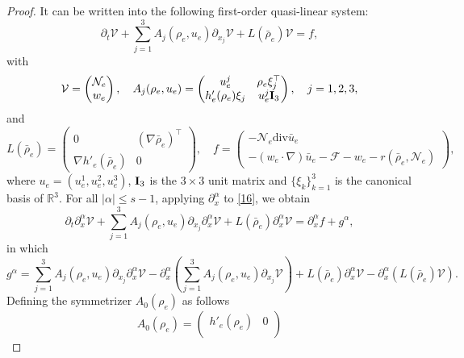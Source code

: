 \documentclass[reqno,twoside,12pt,a4paper]{amsart}
\newcommand{\R}{\mathbb{R}}
\newcommand{\al}{\alpha}
\newcommand{\dive}{\mathrm{div}}
\newcommand{\pt}{\partial_t}
\newcommand{\pa}{\partial}
\numberwithin{equation}{section}
\begin{document}
\begin{proof}
It can be written into the following first-order quasi-linear system:
\begin{equation}\label{16}
    \pt \mathcal{V}+\sum_{j=1}^3 A_j(\rho_e,u_e) \partial_{x_j} \mathcal{V}+ L(\bar{\rho}_e)\mathcal{V}=f,
\end{equation}
with 
\begin{equation*}
    \mathcal{V}=\begin{pmatrix}
    \mathcal{N}_e \\
    w_e
    \end{pmatrix}, \ \ \
    A_j(\rho_e,u_e)=\begin{pmatrix}
    u_{e}^j & \rho_e \xi_j^\top\\
    h'_e(\rho_e)\xi_j& u_{e}^j {\bf{I}}_3
    \end{pmatrix},\ \ \ 
    j=1,2,3,
\end{equation*}
and
\begin{equation*}
    L(\bar{\rho}_e)=\begin{pmatrix}
    0 & (\nabla \bar{\rho}_e)^\top\\
    \nabla h'_e(\bar{\rho}_e) & 0
    \end{pmatrix}, \quad 
    f=\begin{pmatrix}
    - \mathcal{N}_e \dive\bar{u}_e\\
    -(w_e \cdot \nabla) \bar{u}_e
     -\mathcal{F}-w_e-r(\bar{\rho}_e,\mathcal{N}_e)
     \end{pmatrix},
\end{equation*}
where $u_e=(u_e^1, u_e^2, u_e^3)$, ${\bf{I}}_3$ is the $3\times 3$ unit matrix and $\{\xi_k\}_{k=1}^3$ is the canonical basis of $\R^3$. 
For all $|\alpha| \leq s-1$, applying $\pa_x^\al$ to \eqref{16}, we obtain
\begin{equation}\label{17}
    \pt \pa_x^\al \mathcal{V}+\sum_{j=1}^3 A_j(\rho_e,u_e) \partial_{x_j} \pa_x^\al \mathcal{V}+ L(\bar{\rho}_e)\pa_x^\al \mathcal{V}=\pa_x^\al f+g^\alpha,
\end{equation}
in which
\begin{equation*}
    g^\alpha=\sum_{j=1}^3 A_j(\rho_e,u_e) \partial_{x_j} \pa_x^\al \mathcal{V}-\pa_x^\al \left ( \sum_{j=1}^3 A_j(\rho_e,u_e) \partial_{x_j} \mathcal{V} \right )+L(\bar{\rho}_e)\pa_x^\al \mathcal{V}-\pa_x^\al \left (L(\bar{\rho}_e)\mathcal{V} \right ).
\end{equation*}
Defining the symmetrizer $A_0(\rho_e)$ as follows
\begin{equation*}
    A_0(\rho_e)=\begin{pmatrix}
    h'_e(\rho_e) & 0\\

\end{pmatrix}
\end{equation*}
\end{proof}
\end{document}
